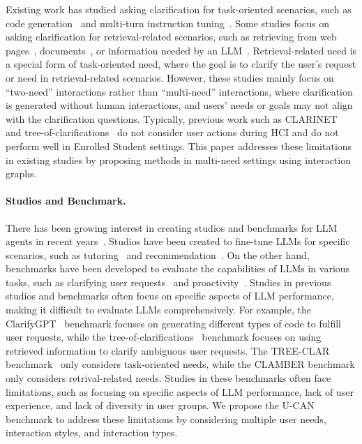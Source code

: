 \documentclass{article} %
\theoremstyle{definition}
\begin{document}
Existing work has studied asking clarification for task-oriented scenarios, such as code generation~\citep{clarifygpt, benchmark_code_generate} and multi-turn instruction tuning~\citep{proactive_cot}. Some studies focus on asking clarification for retrieval-related scenarios, such as retrieving from web pages~\citep{clarinet}, documents~\citep{multiturn_clarification}, or information needed by an LLM~\citep{inscit, star_gate, learn_to_clarify}. Retrieval-related need is a special form of task-oriented need, where the goal is to clarify the user's request or need in retrieval-related scenarios. However, these studies mainly focus on ``two-need'' interactions rather than ``multi-need'' interactions, where clarification is generated without human interactions, and users' needs or goals may not align with the clarification questions. Typically, previous work such as CLARINET~\citep{clarinet} and tree-of-clarifications~\citep{tree_of_clarifications} do not consider user actions during HCI and do not perform well in Enrolled Student settings. This paper addresses these limitations in existing studies by proposing methods in multi-need settings using interaction graphs.

\paragraph{Studios and Benchmark.}
There has been growing interest in creating studios and benchmarks for LLM agents in recent years~\citep{proactive_agents,proactive_cot,pacific,neural_approach,ppdpp,into_the_unknown,agentboard,mt_survey,rlhf,rlaif,multiturn_rlhf,archer,refuel,dpo,lmrl,beyond_goldfish_memory,mteval,g_eval,style}.
Studios have been created to fine-tune LLMs for specific scenarios, such as tutoring~\citep{baize} and recommendation~\citep{interactive_path_reasoning}. On the other hand, benchmarks have been developed to evaluate the capabilities of LLMs in various tasks, such as clarifying user requests~\citep{clarinet,clarify_when_necessary,learn_to_clarify,tree_of_clarifications} and proactivity~\citep{proactive_cot,mixed_initiative_dialogue}. Studies in previous studios and benchmarks often focus on specific aspects of LLM performance, making it difficult to evaluate LLMs comprehensively. For example, the ClarifyGPT~\citep{clarifygpt} benchmark focuses on generating different types of code to fulfill user requests, while the tree-of-clarifications~\citep{tree_of_clarifications} benchmark focuses on using retrieved information to clarify ambiguous user requests. The TREE-CLAR benchmark~\citep{tree_of_clarifications} only considers task-oriented needs, while the CLAMBER benchmark only considers retrival-related needs. Studies in these benchmarks often face limitations, such as focusing on specific aspects of LLM performance, lack of user experience, and lack of diversity in user groups. We propose the U-CAN benchmark to address these limitations by considering multiple user needs, interaction styles, and interaction types.
\end{document}
